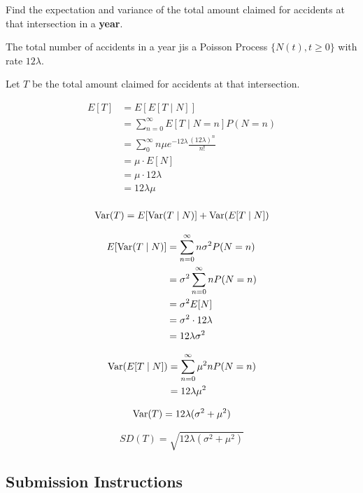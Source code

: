 \documentclass[11pt]{article}
\begin{document}
Find the expectation and variance of the total amount claimed for
accidents at that intersection in a \textbf{year}.


The total number of accidents in a year jis a Poisson Process $\{N(t), t \ge 0\}$ with rate $12\lambda$.

Let $T$ be the total amount claimed for accidents at that intersection. 


\begin{align*}
	E[T] &= E[E[T \mid N]] \\
	&= \sum_{n=0}^{\infty }E[T \mid N=n]P(N=n) \\
	&= \sum_{0}^{\infty } n\mu e^{-12\lambda} \frac{(12\lambda)^{n}}{n!} \\
	&= \mu  \cdot E[N] \\
	&= \mu \cdot 12\lambda \\
	&= 12\lambda\mu  \\
\end{align*}

\begin{align*}
	\operatorname{Var}(T) &= E[\operatorname{Var}(T \mid N)] + \operatorname{Var}(E[T \mid N]) \\
\end{align*}

\begin{align*}
	E[\operatorname{Var}(T \mid N)] &= \sum_{n=0}^{\infty } n\sigma^{2} P(N=n) \\
	&= \sigma^{2} \sum_{n=0}^{\infty }nP(N=n) \\
	&= \sigma^{2} E[N] \\
	&= \sigma^{2} \cdot 12\lambda \\
	&= 12\lambda\sigma^{2} \\
\end{align*}

\begin{align*}
	\operatorname{Var}(E[T \mid N]) &= \sum_{n=0}^{\infty } \mu ^{2} n P(N=n) \\
	&= 12\lambda\mu ^{2} \\
\end{align*}

\[
\operatorname{Var}(T) =  12\lambda(\sigma^{2} + \mu ^{2}) 
\]

\[
	SD(T) = \sqrt{12\lambda(\sigma^{2} + \mu ^{2})}
\]



    \newpage

    \hypertarget{submission-instructions}{%
\subsection{Submission Instructions}\label{submission-instructions}}
\end{document}
